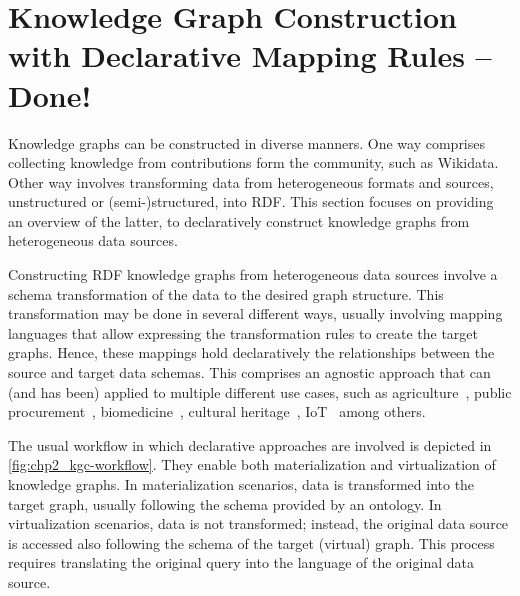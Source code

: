 \section{Knowledge Graph Construction with Declarative Mapping Rules \textcolor{shamrockgreen}{-- Done!}}
\label{sec:chp2_declarative_kgc}

Knowledge graphs can be constructed in diverse manners. One way comprises collecting knowledge from contributions form the community, such as Wikidata. Other way involves transforming data from heterogeneous formats and sources, unstructured or (semi-)structured, into RDF. This section focuses on providing an overview of the latter, to declaratively construct knowledge graphs from heterogeneous data sources.




Constructing RDF knowledge graphs from heterogeneous data sources involve a schema transformation of the data to the desired graph structure. This transformation may be done in several different ways, usually involving mapping languages that allow expressing the transformation rules to create the target graphs. Hence, these mappings hold declaratively the relationships between the source and target data schemas. This comprises an agnostic approach that can (and has been) applied to multiple different use cases, such as agriculture~\parencite{bilbao2022practical}, public procurement~\parencite{soylu2022theybuyforyou}, biomedicine~\parencite{iglesias2019bio2rdf,michel2020covid,aisopos2023knowledge}, cultural heritage~\parencite{calvanese2016culturalheritage}, IoT~\parencite{cimmino2020ewot,gonzalezgerpe2022extension} among others.

The usual workflow in which declarative approaches are involved is depicted in \cref{fig:chp2_kgc-workflow}. They enable both materialization and virtualization of knowledge graphs. In materialization scenarios, data is transformed into the target graph, usually following the schema provided by an ontology. In virtualization scenarios, data is not transformed; instead, the original data source is accessed also following the schema of the target (virtual) graph. This process requires translating the original query into the language of the original data source. %

